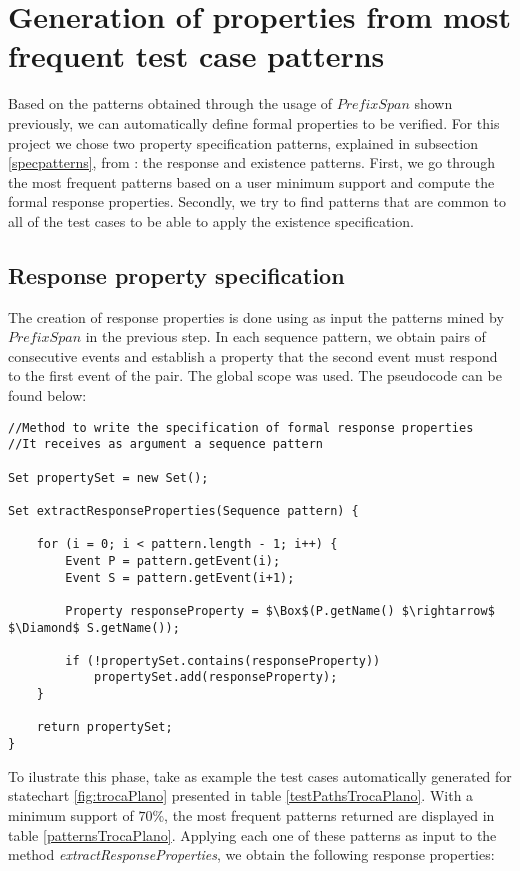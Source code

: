 \section{Generation of properties from most frequent test case patterns}
\label{genproppatterns}

Based on the patterns obtained through the usage of $PrefixSpan$ shown previously, we can automatically define formal properties to be verified. For this project we chose two property specification patterns, explained in subsection \ref{specpatterns}, from \cite{dwyer98}: the response and existence patterns. First, we go through the most frequent patterns based on a user minimum support and compute the formal response properties. Secondly, we  try to find patterns that are common to all of the test cases to be able to apply the existence specification.

\subsection{Response property specification}
\label{responseSpec}

The creation of response properties is done using as input the patterns mined by $PrefixSpan$ in the previous step. In each sequence pattern, we obtain pairs of consecutive events and establish a property that the second event must respond to the first event of the pair. The global scope was used. The pseudocode can be found below:

\begin{lstlisting}[mathescape]
//Method to write the specification of formal response properties
//It receives as argument a sequence pattern 

Set propertySet = new Set();

Set extractResponseProperties(Sequence pattern) {

	for (i = 0; i < pattern.length - 1; i++) {
		Event P = pattern.getEvent(i);
		Event S = pattern.getEvent(i+1);

		Property responseProperty = $\Box$(P.getName() $\rightarrow$ $\Diamond$ S.getName());

		if (!propertySet.contains(responseProperty))
			propertySet.add(responseProperty);
	}

	return propertySet;
}
\end{lstlisting}

To ilustrate this phase, take as example the test cases automatically generated for statechart \ref{fig:trocaPlano} presented in table \ref{testPathsTrocaPlano}. With a minimum support of $70\%$, the most frequent patterns returned are displayed in table \ref{patternsTrocaPlano}. Applying each one of these patterns as input to the method \textit{extractResponseProperties}, we obtain the following response properties:

